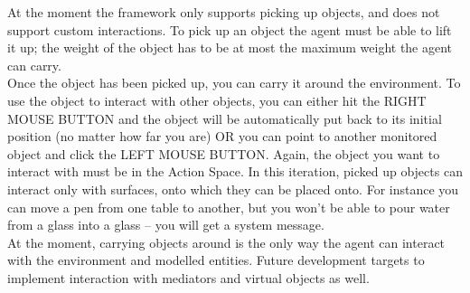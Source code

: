 At the moment the framework only supports picking up objects, and does not support custom interactions. To pick up an object the agent must be able to lift it up; the weight of the object has to be at most the maximum weight the agent can carry.\\

Once the object has been picked up, you can carry it around the environment. To use the object to interact with other objects, you can either hit the RIGHT MOUSE BUTTON and the object will be automatically put back to its initial position (no matter how far you are) OR you can point to another monitored object and click the LEFT MOUSE BUTTON. Again, the object you want to interact with must be in the Action Space. In this iteration, picked up objects can interact only with surfaces, onto which they can be placed onto. For instance you can move a pen from one table to another, but you won't be able to pour water from a glass into a glass -- you will get a system message.\\

At the moment, carrying objects around is the only way the agent can interact with the environment and modelled entities. Future development targets to implement interaction with mediators and virtual objects as well.\\
